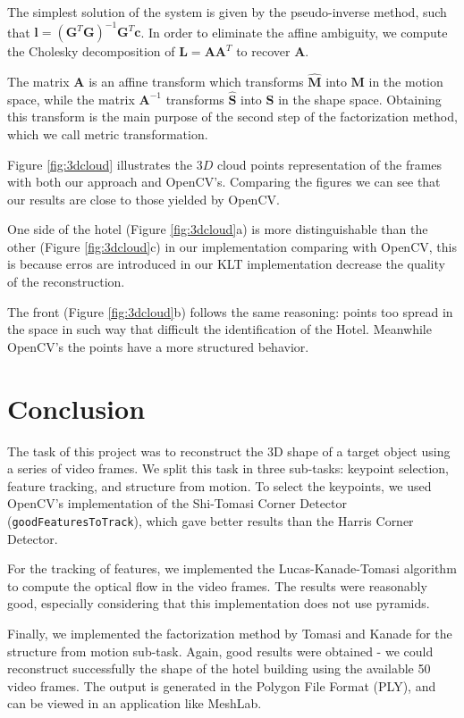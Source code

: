 \documentclass[]{IEEEtran}
\begin{document}
The simplest solution of the system is given by the pseudo-inverse method, such that $\bm{l} = (\bm{G}^T\bm{G})^{-1}\bm{G}^T\bm{c}$. In order to eliminate the affine ambiguity, we compute the Cholesky decomposition of $\bm{L} = \bm{A}\bm{A}^T$ to recover $\bm{A}$.

The matrix $\bm{A}$ is an affine transform which transforms $\hat{\bm{M}}$ into $\bm{M}$ in the motion space, while the matrix $\bm{A}^{-1}$ transforms $\hat{\bm{S}}$ into $\bm{S}$ in the shape space. Obtaining this transform is the main purpose of the second step of the factorization method, which we call metric transformation.

Figure \ref{fig:3dcloud} illustrates the $3D$ cloud points representation of the frames with both our approach and OpenCV's. Comparing the figures we can see that our results are close to those yielded by OpenCV.

One side of the hotel (Figure \ref{fig:3dcloud}a) is more distinguishable than the other (Figure \ref{fig:3dcloud}c) in our implementation comparing with OpenCV, this is because erros are introduced in our KLT implementation decrease the quality of the reconstruction.

The front (Figure \ref{fig:3dcloud}b) follows the same reasoning: points too spread in the space in such way that difficult the identification of the Hotel. Meanwhile OpenCV's the points have a more structured behavior.

\section{Conclusion}
The task of this project was to reconstruct the 3D shape of a target object using a series of video frames. We split this task in three sub-tasks: keypoint selection, feature tracking, and structure from motion. To select the keypoints, we used OpenCV's implementation of the Shi-Tomasi Corner Detector (\texttt{goodFeaturesToTrack}), which gave better results than the Harris Corner Detector.

For the tracking of features, we implemented the Lucas-Kanade-Tomasi algorithm to compute the optical flow in the video frames. The results were reasonably good, especially considering that this implementation does not use pyramids.

Finally, we implemented the factorization method by Tomasi and Kanade for the structure from motion sub-task. Again, good results were obtained - we could reconstruct successfully the shape of the hotel building using the available 50 video frames. The output is generated in the Polygon File Format (PLY), and can be viewed in an application like MeshLab.
\end{document}
